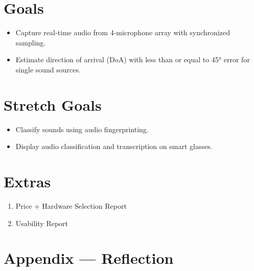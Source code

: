 \documentclass{article}
\begin{document}
\section{Goals}

\begin{itemize}
    \item Capture real-time audio from 4-microphone array with synchronized sampling.
    \item Estimate direction of arrival (DoA) with less than or equal to 45° error for single sound sources.
\end{itemize}
\section{Stretch Goals}

\begin{itemize}
    \item Classify sounds using audio fingerprinting.
    \item Display audio classification and transcription on smart glasses.
\end{itemize}
\section{Extras}

\begin{enumerate}
    \item Price + Hardware Selection Report
    \item Usability Report
\end{enumerate} 

\newpage{}

\section*{Appendix --- Reflection}



\end{document}
